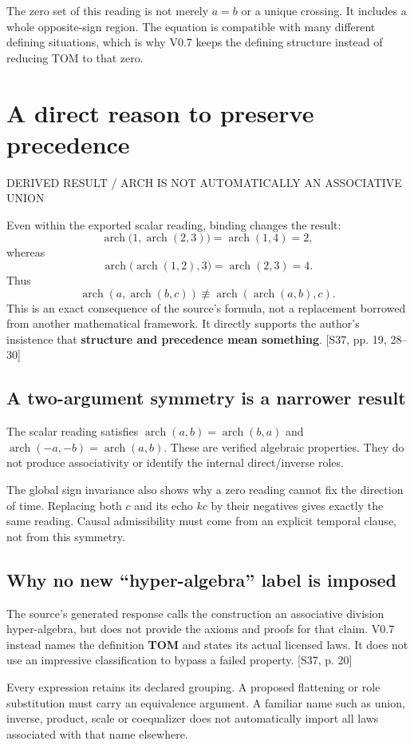 \documentclass[11pt,a4paper]{article}
\newcommand{\newsec}[2]{\clearpage\section{#1}{\sffamily\footnotesize\color{teal}\MakeUppercase{#2}\par}\vspace{5pt}}
\newcommand{\src}[1]{{\small\color{muted}[S37, #1]}}
\newcommand{\ar}{\operatorname{arch}}
\begin{document}
\begin{boxx}
The zero set of this reading is not merely $a=b$ or a unique crossing. It includes a whole opposite-sign region. The equation is compatible with many different defining situations, which is why V0.7 keeps the defining structure instead of reducing TOM to that zero.
\end{boxx}

\newsec{A direct reason to preserve precedence}{Derived result / Arch is not automatically an associative union}
Even within the exported scalar reading, binding changes the result:
\[
 \ar\bigl(1,\ar(2,3)\bigr)=\ar(1,4)=2,
\]
whereas
\[
 \ar\bigl(\ar(1,2),3\bigr)=\ar(2,3)=4.
\]
Thus
\[
 \boxed{\ar(a,\ar(b,c))\not\equiv\ar(\ar(a,b),c).}
\]
This is an exact consequence of the source's formula, not a replacement borrowed from another mathematical framework. It directly supports the author's insistence that \textbf{structure and precedence mean something}. \src{pp. 19, 28--30}

\subsection{A two-argument symmetry is a narrower result}
The scalar reading satisfies $\ar(a,b)=\ar(b,a)$ and $\ar(-a,-b)=\ar(a,b)$. These are verified algebraic properties. They do not produce associativity or identify the internal direct/inverse roles.

The global sign invariance also shows why a zero reading cannot fix the direction of time. Replacing both $c$ and its echo $kc$ by their negatives gives exactly the same reading. Causal admissibility must come from an explicit temporal clause, not from this symmetry.

\subsection{Why no new ``hyper-algebra'' label is imposed}
The source's generated response calls the construction an associative division hyper-algebra, but does not provide the axioms and proofs for that claim. V0.7 instead names the definition \textbf{TOM} and states its actual licensed laws. It does not use an impressive classification to bypass a failed property. \src{p. 20}

\begin{boxx}
Every expression retains its declared grouping. A proposed flattening or role substitution must carry an equivalence argument. A familiar name such as union, inverse, product, scale or coequalizer does not automatically import all laws associated with that name elsewhere.
\end{boxx}
\end{document}
